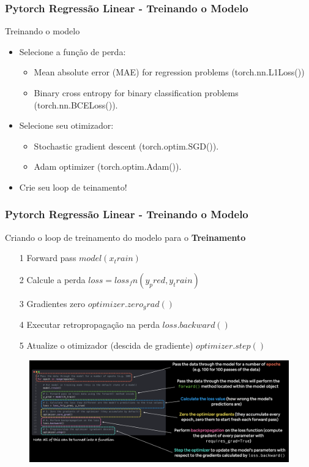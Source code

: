 \documentclass{beamer}
\begin{document}
\begin{frame}
	\frametitle{Pytorch Regressão Linear - Treinando o Modelo}
	\begin{block}{Treinando o modelo}
		\begin{itemize}
			\item Selecione a função de perda:
			\begin{itemize}
				\item Mean absolute error (MAE) for regression problems (torch.nn.L1Loss())
				\item Binary cross entropy for binary classification problems (torch.nn.BCELoss()).
			\end{itemize}
			\item Selecione seu otimizador:
				\begin{itemize}
					\item Stochastic gradient descent (torch.optim.SGD()).
					\item Adam optimizer (torch.optim.Adam()).
				\end{itemize}
			\item Crie seu loop de teinamento!
		\end{itemize}
		
	\end{block}
\end{frame}
\begin{frame}
	\frametitle{Pytorch Regressão Linear - Treinando o Modelo}
	\begin{block}{Criando o loop de treinamento do modelo para o \textbf{Treinamento}}
		\begin{itemize}
			\item[1] Forward pass $model(x_train)$ 
			\item[2] Calcule a perda $loss = loss_fn(y_pred, y_train)$
			\item[3] Gradientes zero $optimizer.zero_grad()$
			\item[4] Executar retropropagação na perda $loss.backward()$
			\item[5] Atualize o otimizador (descida de gradiente) $optimizer.step()$
		\end{itemize}
		\begin{figure}
			\centering
			\includegraphics[width=0.7\linewidth]{figures/steps_train_torch}
		\end{figure}
		
	\end{block}
\end{frame}
\end{document}

